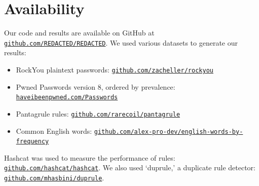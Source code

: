 \documentclass{article}
\begin{document}
\section*{Availability}

Our code and results are available on GitHub at
\texttt{\href{https://github.com/REDACTED/REDACTED}
{github.com/REDACTED/REDACTED}}. We used various datasets
to generate our results:

\begin{itemize}
\item RockYou plaintext passwords:
\texttt{\href{https://github.com/zacheller/rockyou}
{github.com/zacheller/rockyou}}
\item Pwned Passwords version 8, ordered by prevalence:\newline
\texttt{\href{https://haveibeenpwned.com/Passwords}
{haveibeenpwned.com/Passwords}}
\item Pantagrule rules:
\texttt{\href{https://github.com/rarecoil/pantagrule}
{github.com/rarecoil/pantagrule}}
\item Common English words:\newline
\texttt{\href{https://github.com/alex-pro-dev/english-words-by-frequency}
{github.com/alex-pro-dev/english-words-by-frequency}}
\end{itemize}

Hashcat was used to measure the performance of rules:\newline
\texttt{\href{https://github.com/hashcat/hashcat}{github.com/hashcat/hashcat}}.
We also used
`duprule,' a duplicate rule detector:
\texttt{\href{https://github.com/mhasbini/duprule}
{github.com/mhasbini/duprule}}.

\medskip

\printbibliography
\end{document}
